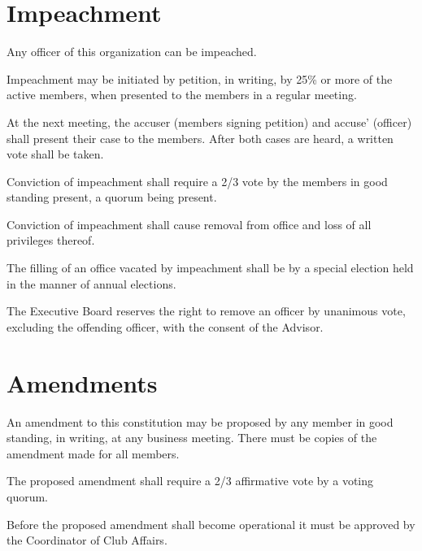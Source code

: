 \section{Impeachment}
\begin{subroutines}
\item Any officer of this organization can be impeached.
\item Impeachment may be initiated by petition, in writing, by 25\% or more of the active members, when presented to the members in a regular meeting.
\item At the next meeting, the accuser (members signing petition) and accuse’ (officer) shall present their case to the members. After both cases are heard, a written vote shall be taken.
\item Conviction of impeachment shall require a 2/3 vote by the members in good standing present, a quorum being present.
\item Conviction of impeachment shall cause removal from office and loss of all privileges thereof.
\item The filling of an office vacated by impeachment shall be by a special election held in the manner of annual elections.
\item The Executive Board reserves the right to remove an officer by unanimous vote, excluding the offending officer, with the consent of the Advisor.
\end{subroutines}

\section{Amendments}
\begin{subroutines}
\item An amendment to this constitution may be proposed by any member in good standing, in writing, at any business meeting. There must be copies of the amendment made for all members.
\item The proposed amendment shall require a 2/3 affirmative vote by a voting quorum.
\item Before the proposed amendment shall become operational it must be approved by the Coordinator of Club Affairs.
\end{subroutines}

